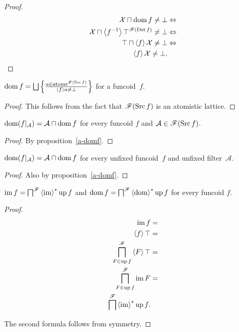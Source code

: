 \begin{proof}
~
\begin{align*}
\mathcal{X}\sqcap\operatorname{dom} f\ne\bot & \Leftrightarrow\\
\mathcal{X}\sqcap\left\langle f^{-1}\right\rangle\top^{\mathscr{F}(\operatorname{Dst}
f)}\ne\bot & \Leftrightarrow\\
\top\sqcap\left\langle f\right\rangle\mathcal{X}\ne\bot & \Leftrightarrow\\
\left\langle f\right\rangle\mathcal{X}\ne\bot.
\end{align*}
\end{proof}
\begin{cor}\label{dom-fcd-at}
$\dom f=\bigsqcup\setcond{a\in\atoms^{\mathscr{F}(\Src f)}}{\supfun
fa\ne\bot}$ for a funcoid~$f$.
\end{cor}
\begin{proof}
This follows from the fact that $\mathscr{F}(\operatorname{Src} f)$ is an atomistic
lattice.\end{proof}

\begin{prop}
$\operatorname{dom}(f|_{\mathcal{A}})=\mathcal{A}\sqcap\operatorname{dom} f$ for every funcoid
$f$ and $\mathcal{A}\in\mathscr{F}(\operatorname{Src} f)$.\end{prop}

\begin{proof}
By proposition~\ref{a-domf}.
\end{proof}

\begin{cor}
$\operatorname{dom}(f|_{\mathcal{A}})=\mathcal{A}\sqcap\operatorname{dom} f$ for every unfixed funcoid~$f$
and unfixed filter~$\mathcal{A}$.
\end{cor}

\begin{proof}
Also by proposition~\ref{a-domf}.
\end{proof}

\begin{thm}
$\operatorname{im} f=\bigsqcap^{\mathscr{F}}\left\langle \operatorname{im}\right\rangle ^{\ast}\operatorname{up} f$ and $\operatorname{dom}
f=\bigsqcap^{\mathscr{F}}\left\langle \operatorname{dom}\right\rangle ^{\ast}\operatorname{up} f$
for every funcoid $f$.\end{thm}
\begin{proof}
~
\begin{align*}
\operatorname{im} f & =\\
\left\langle f\right\rangle\top & =\\
\bigsqcap_{F\in\operatorname{up} f}^{\mathscr{F}}\left\langle F\right\rangle\top & =\\
\bigsqcap_{F\in\operatorname{up} f}^{\mathscr{F}}\operatorname{im} F & =\\
\bigsqcap^{\mathscr{F}}\left\langle \operatorname{im}\right\rangle ^{\ast}\operatorname{up} f.
\end{align*}

The second formula follows from symmetry.\end{proof}

